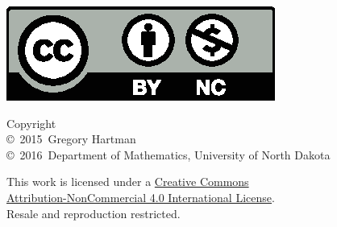 
\noindent\hspace{-1in}\begin{minipage}{2in}
\href{http://creativecommons.org/licenses/by-nc/4.0/}{\includegraphics{text/by-nc}}
\end{minipage}%
\begin{minipage}{3in}\raggedright
\noindent Copyright\\
\copyright~2015~Gregory Hartman\\
\copyright~2016~Department of Mathematics, University of North Dakota

This work is licensed under a \href{http://creativecommons.org/licenses/by-nc/4.0/}{Creative Commons\\Attribution-NonCommercial 4.0 International License}.\\
Resale and reproduction restricted.
\end{minipage}

